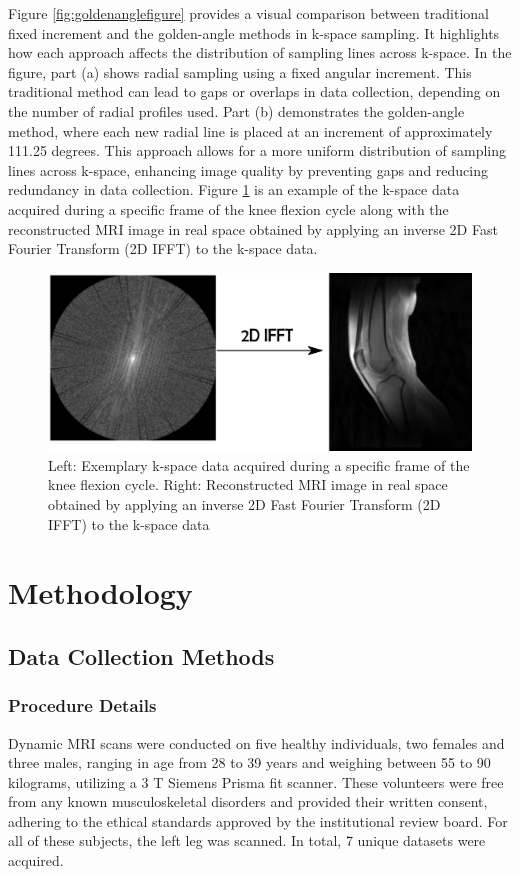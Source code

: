 \documentclass{micro-econ-thesis}
\begin{document}
 
Figure \ref{fig:goldenanglefigure} provides a visual comparison between traditional fixed increment and the golden-angle methods in k-space sampling. It highlights how each approach affects the distribution of sampling lines across k-space. In the figure, part (a) shows radial sampling using a fixed angular increment. This traditional method can lead to gaps or overlaps in data collection, depending on the number of radial profiles used. Part (b) demonstrates the golden-angle method, where each new radial line is placed at an increment of approximately 111.25 degrees. This approach allows for a more uniform distribution of sampling lines across k-space, enhancing image quality by preventing gaps and reducing redundancy in data collection. Figure \ref{fig:kspacearrow} is an example of the k-space data acquired during a specific frame of the knee flexion cycle along with  the reconstructed MRI image in real space obtained by applying an inverse 2D Fast Fourier Transform (2D IFFT) to the k-space data.
\begin{figure}[H]
	\centering
	\includegraphics[scale=0.3]{kspace_arrow_2}
	\caption{Left: Exemplary k-space data acquired during a specific frame of the knee flexion cycle. Right: Reconstructed MRI image in real space obtained by applying an inverse 2D Fast Fourier Transform (2D IFFT) to the k-space data}
	\label{fig:kspacearrow}
\end{figure}
  


\section{Methodology}
\label{sec:second}

\subsection{Data Collection Methods}

\subsubsection{Procedure Details}
Dynamic MRI scans were conducted on five healthy individuals, two females and three males, ranging in age from 28 to 39 years and weighing between 55 to 90 kilograms, utilizing a 3 T Siemens Prisma fit scanner. These volunteers were free from any known musculoskeletal disorders and provided their written consent, adhering to the ethical standards approved by the institutional review board. For all of these subjects, the left leg was scanned. In total, 7 unique datasets were acquired. 
\end{document}
